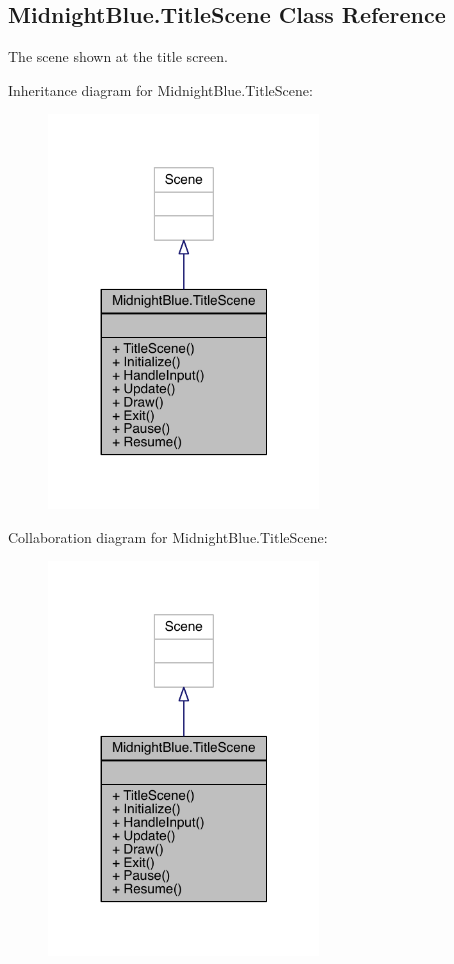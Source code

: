 \hypertarget{class_midnight_blue_1_1_title_scene}{}\subsection{Midnight\+Blue.\+Title\+Scene Class Reference}
\label{class_midnight_blue_1_1_title_scene}


The scene shown at the title screen.  




Inheritance diagram for Midnight\+Blue.\+Title\+Scene\+:\nopagebreak
\begin{figure}[H]
\begin{center}
\leavevmode
\includegraphics[width=203pt]{class_midnight_blue_1_1_title_scene__inherit__graph}
\end{center}
\end{figure}


Collaboration diagram for Midnight\+Blue.\+Title\+Scene\+:\nopagebreak
\begin{figure}[H]
\begin{center}
\leavevmode
\includegraphics[width=203pt]{class_midnight_blue_1_1_title_scene__coll__graph}
\end{center}
\end{figure}
